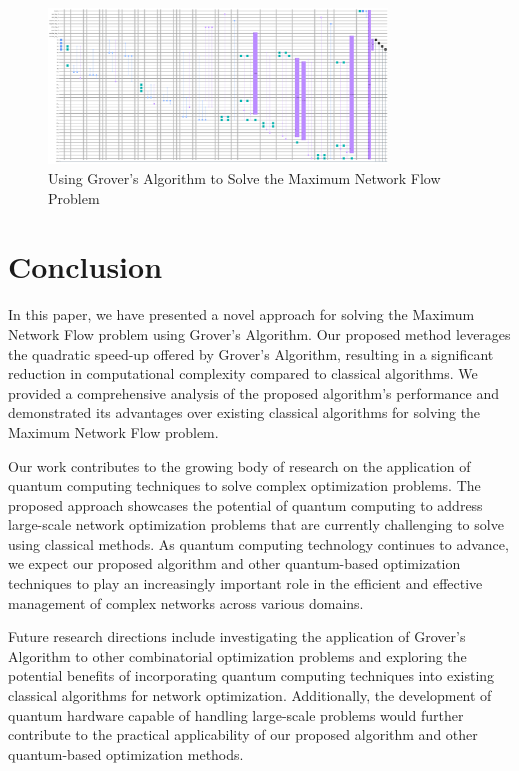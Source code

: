 \begin{figure}[htp]
    \centering
    \includegraphics[width=9cm]{Figures/Maximum_Network_Flow_circuit.png}
    \caption{Using Grover's Algorithm to Solve the Maximum Network Flow Problem}
    \label{fig:Maximum_Network_Flow}
\end{figure}

\section{Conclusion}
\label{sec:conclusion}

In this paper, we have presented a novel approach for solving the Maximum Network Flow problem using Grover's Algorithm. Our proposed method leverages the quadratic speed-up offered by Grover's Algorithm, resulting in a significant reduction in computational complexity compared to classical algorithms. We provided a comprehensive analysis of the proposed algorithm's performance and demonstrated its advantages over existing classical algorithms for solving the Maximum Network Flow problem.

Our work contributes to the growing body of research on the application of quantum computing techniques to solve complex optimization problems. The proposed approach showcases the potential of quantum computing to address large-scale network optimization problems that are currently challenging to solve using classical methods. As quantum computing technology continues to advance, we expect our proposed algorithm and other quantum-based optimization techniques to play an increasingly important role in the efficient and effective management of complex networks across various domains.

Future research directions include investigating the application of Grover's Algorithm to other combinatorial optimization problems and exploring the potential benefits of incorporating quantum computing techniques into existing classical algorithms for network optimization. Additionally, the development of quantum hardware capable of handling large-scale problems would further contribute to the practical applicability of our proposed algorithm and other quantum-based optimization methods.

